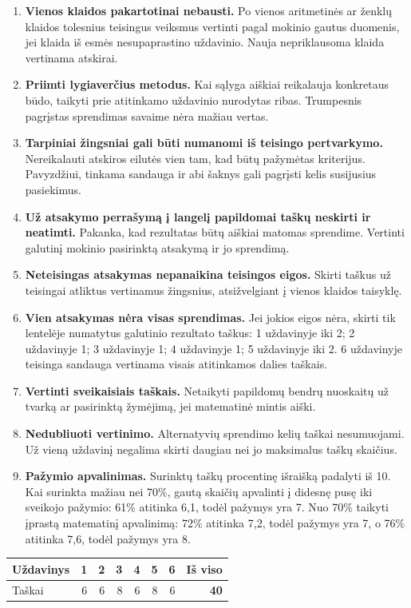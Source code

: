 \documentclass[11pt]{article}
\newcommand{\sk}[1]{\par\medskip{\large\bfseries #1}\par}
\begin{document}
\newpage
\sk{Bendrosios vertinimo taisyklės}
\begin{enumerate}[leftmargin=*,itemsep=8pt]
\item \textbf{Vienos klaidos pakartotinai nebausti.} Po vienos aritmetinės ar ženklų klaidos tolesnius teisingus veiksmus vertinti pagal mokinio gautus duomenis, jei klaida iš esmės nesupaprastino uždavinio. Nauja nepriklausoma klaida vertinama atskirai.
\item \textbf{Priimti lygiaverčius metodus.} Kai sąlyga aiškiai reikalauja konkretaus būdo, taikyti prie atitinkamo uždavinio nurodytas ribas. Trumpesnis pagrįstas sprendimas savaime nėra mažiau vertas.
\item \textbf{Tarpiniai žingsniai gali būti numanomi iš teisingo pertvarkymo.} Nereikalauti atskiros eilutės vien tam, kad būtų pažymėtas kriterijus. Pavyzdžiui, tinkama sandauga ir abi šaknys gali pagrįsti kelis susijusius pasiekimus.
\item \textbf{Už atsakymo perrašymą į langelį papildomai taškų neskirti ir neatimti.} Pakanka, kad rezultatas būtų aiškiai matomas sprendime. Vertinti galutinį mokinio pasirinktą atsakymą ir jo sprendimą.
\item \textbf{Neteisingas atsakymas nepanaikina teisingos eigos.} Skirti taškus už teisingai atliktus vertinamus žingsnius, atsižvelgiant į vienos klaidos taisyklę.
\item \textbf{Vien atsakymas nėra visas sprendimas.} Jei jokios eigos nėra, skirti tik lentelėje numatytus galutinio rezultato taškus: 1 uždavinyje iki 2; 2 uždavinyje 1; 3 uždavinyje 1; 4 uždavinyje 1; 5 uždavinyje iki 2. 6 uždavinyje teisinga sandauga vertinama visais atitinkamos dalies taškais.
\item \textbf{Vertinti sveikaisiais taškais.} Netaikyti papildomų bendrų nuoskaitų už tvarką ar pasirinktą žymėjimą, jei matematinė mintis aiški.
\item \textbf{Nedubliuoti vertinimo.} Alternatyvių sprendimo kelių taškai nesumuojami. Už vieną uždavinį negalima skirti daugiau nei jo maksimalus taškų skaičius.
\item \textbf{Pažymio apvalinimas.} Surinktų taškų procentinę išraišką padalyti iš 10. Kai surinkta mažiau nei 70\%, gautą skaičių apvalinti į didesnę pusę iki sveikojo pažymio: 61\% atitinka 6,1, todėl pažymys yra 7. Nuo 70\% taikyti įprastą matematinį apvalinimą: 72\% atitinka 7,2, todėl pažymys yra 7, o 76\% atitinka 7,6, todėl pažymys yra 8.
\end{enumerate}
\medskip
\begin{center}
\begin{tabular}{lrrrrrrr}
\toprule
Uždavinys & 1 & 2 & 3 & 4 & 5 & 6 & Iš viso\\
\midrule
Taškai & 6 & 6 & 8 & 6 & 8 & 6 & \textbf{40}\\
\bottomrule
\end{tabular}
\end{center}
\end{document}
